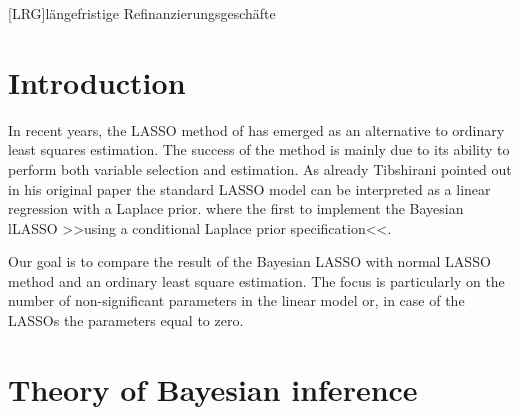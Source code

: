 \documentclass[12pt,a4paper]{article}
\begin{document}
\begin{adjustwidth}{1.5em}{0pt}

\begin{acronym}[dummyyyy]
 [LRG]{längefristige Refinanzierungsgeschäfte}

\end{acronym}

\end{adjustwidth}

\restoregeometry

\newpage
{} %

\hypertarget{introduction}{%
\section{Introduction}\label{introduction}}

In recent years, the \ac{LASSO} method of
\textcite{tibshirani_regression_1996} has emerged as an alternative to
ordinary least squares estimation. The success of the method is mainly
due to its ability to perform both variable selection and estimation. As
already Tibshirani pointed out in his original paper the standard
\ac{LASSO} model can be interpreted as a linear regression with a
Laplace prior. \textcite{park_bayesian_2008} where the first to
implement the Bayesian l\ac{LASSO} \textgreater\textgreater using a
conditional Laplace prior specification\textless\textless.

Our goal is to compare the result of the Bayesian \ac{LASSO} with normal
\ac{LASSO} method and an ordinary least square estimation. The focus is
particularly on the number of non-significant parameters in the linear
model or, in case of the \acp{LASSO} the parameters equal to zero.

\newpage

\hypertarget{theory-of-bayesian-inference}{%
\section{Theory of Bayesian
inference}\label{theory-of-bayesian-inference}}
\end{document}
